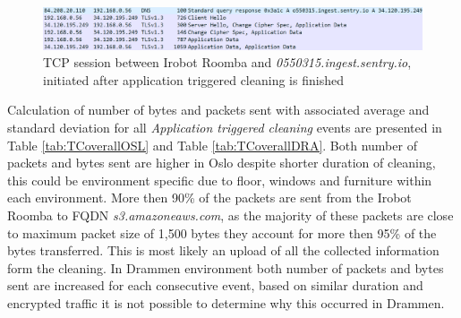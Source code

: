 \begin{figure}[H]
    \centering
    \includegraphics[width=\textwidth]{figures/irobot_ATC_DNSimgset.png}
    \caption{TCP session between Irobot Roomba and \textit{0550315.ingest.sentry.io}, initiated after application triggered cleaning is finished}
    \label{fig:ATC_DNS_ingest}
\end{figure}

Calculation of number of bytes and packets sent with associated average and standard deviation for all \textit{Application triggered cleaning} events are presented in Table \ref{tab:TCoverallOSL} and Table \ref{tab:TCoverallDRA}. Both number of packets and bytes sent are higher in Oslo despite shorter duration of cleaning, this could be environment specific due to floor, windows and furniture within each environment. More then 90\% of the packets are sent from the Irobot Roomba to FQDN \textit{s3.amazoneaws.com}, as the majority of these packets are close to maximum packet size of 1,500 bytes they account for more then 95\% of the bytes transferred. This is most likely an upload of all the collected information form the cleaning. In Drammen environment both number of packets and bytes sent are increased for each consecutive event, based on similar duration and encrypted traffic it is not possible to determine why this occurred in Drammen. 

